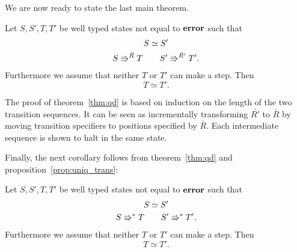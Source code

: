 We are now ready to state the last main theorem.

\begin{theorem} \label{thm:qd}
  Let $S, S', T, T'$ be well typed states not equal to $\mbox{{\bf error}}$ such that
  \begin{equation*}
    \begin{gathered}
      S \simeq S' \\
      S \Rrightarrow^{\bar{R}} T \quad\quad S' \Rrightarrow^{\bar{R'}} T'.
    \end{gathered}
  \end{equation*}
  Furthermore we assume that neither $T$ or $T'$ can make a step.
  Then
  \begin{equation*}
    T \simeq T'.
  \end{equation*}
\end{theorem}

The proof of theorem~\ref{thm:qd} is based on induction on the length of the two
transition sequences. It can be seen as incrementally transforming $\bar{R'}$ to
$\bar{R}$ by moving transition specifiers to positions specified by $\bar{R}$.
Each intermediate sequence is shown to halt in the same state.

Finally, the next corollary follows from theorem~\ref{thm:qd} and
proposition~\ref{prop:uniq_trans}:
\begin{corollary}
  Let $S, S', T, T'$ be well typed states not equal to $\mbox{{\bf error}}$ such that
  \begin{equation*}
    \begin{gathered}
      S \simeq S' \\
      S \Rrightarrow^* T \quad\quad S' \Rrightarrow^* T'.
    \end{gathered}
  \end{equation*}
  Furthermore we assume that neither $T$ or $T'$ can make a step.
  Then
  \begin{equation*}
    T \simeq T'.
  \end{equation*}
\end{corollary}


